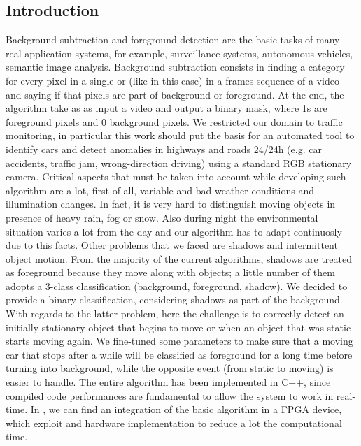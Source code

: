 \subsection*{Introduction}
Background subtraction and foreground detection are the basic tasks of many real application systems,
for example, surveillance systems, autonomous vehicles, semantic image analysis. Background subtraction
consists in finding a category for every pixel in a single or (like in this case) in a frames sequence
of a video and saying if that pixels are part of background or foreground. At the end, the algorithm take as
as input a video and output a binary mask, where 1s are foreground pixels and 0 background pixels.
We restricted our domain to traffic monitoring, in particular this work should put the basis for an automated
tool to identify cars and detect anomalies in highways and roads 24/24h (e.g. car accidents,
traffic jam, wrong-direction driving) using a standard RGB stationary camera.
Critical aspects that must be taken into account while
developing such algorithm are a lot, first of all, variable and bad weather conditions and illumination
changes. In fact, it is very hard to distinguish moving objects in presence of heavy rain, fog or snow.
Also during night the environmental situation varies a lot from the day and our algorithm has to adapt
continuosly due to this facts. Other problems that we faced are shadows and intermittent object motion.
From the majority of the current algorithms, shadows are treated as foreground because they move along with
objects; a little number of them adopts a 3-class classification (background, foreground, shadow). We
decided to provide a binary classification, considering shadows as part of the background. With regards to
the latter problem, here the challenge is to correctly detect an initially stationary object that begins to
move or when an object that was static starts moving again. We fine-tuned some parameters to make sure
that a moving car that stops after a while will be classified as foreground for a long time before turning
into background, while the opposite event (from static to moving) is easier to handle.
The entire algorithm has been implemented in C++, since compiled code performances are fundamental to
allow the system to work in real-time. In \cite{pbasandsceneanalysisfpga}, we can find an integration of the basic algorithm in
a FPGA device, which exploit and hardware implementation to reduce a lot the computational time.


